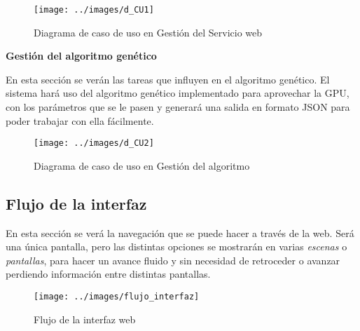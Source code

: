 \bigskip
\begin{figure}[h]
	\centering
	\texttt{[image: ../images/d\_CU1]}
	\caption[Diagrama de caso de uso en Gestión del Servicio web]{Diagrama de caso de uso en Gestión del Servicio web}
	\label{fig:d_CU1}
\end{figure}



\bigskip
\textbf{Gestión del algoritmo genético}

\bigskip
En esta sección se verán las tareas que influyen en el algoritmo genético. El sistema hará uso del algoritmo genético implementado para aprovechar la GPU, con los parámetros que se le pasen y generará una salida en formato JSON para poder trabajar con ella fácilmente.

\bigskip
\begin{figure}[h]
	\centering
	\texttt{[image: ../images/d\_CU2]}
	\caption[Diagrama de caso de uso en Gestión del algoritmo]{Diagrama de caso de uso en Gestión del algoritmo}
	\label{fig:d_CU2}
\end{figure}


\bigskip
\subsection{Flujo de la interfaz}
\bigskip

En esta sección se verá la navegación que se puede hacer a través de la web. Será una única pantalla, pero las distintas opciones se mostrarán en varias \textit{escenas} o \textit{pantallas}, para hacer un avance fluido y sin necesidad de retroceder o avanzar perdiendo información entre distintas pantallas.

\bigskip
\begin{figure}[h]
	\centering
	\texttt{[image: ../images/flujo\_interfaz]}
	\caption[Flujo de la interfaz web]{Flujo de la interfaz web}
	\label{fig:flujo_interfaz}
\end{figure}

